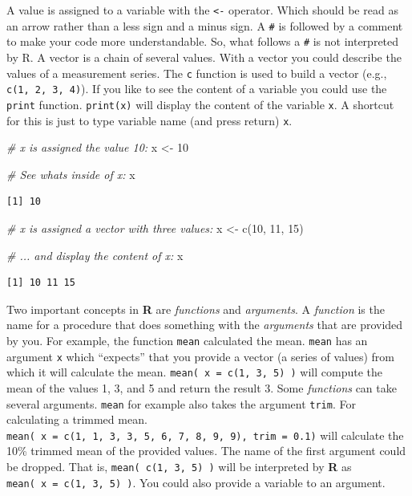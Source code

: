 \documentclass[
]{book}
\newenvironment{Shaded}{\begin{snugshade}}{\end{snugshade}}
\newcommand{\CommentTok}[1]{\textcolor[rgb]{0.56,0.35,0.01}{\textit{#1}}}
\newcommand{\DecValTok}[1]{\textcolor[rgb]{0.00,0.00,0.81}{#1}}
\newcommand{\FunctionTok}[1]{\textcolor[rgb]{0.00,0.00,0.00}{#1}}
\newcommand{\NormalTok}[1]{#1}
\newcommand{\OtherTok}[1]{\textcolor[rgb]{0.56,0.35,0.01}{#1}}
\begin{document}
A value is assigned to a variable with the \texttt{\textless{}-} operator. Which should be read as an arrow rather than a less sign and a minus sign. A \texttt{\#} is followed by a comment to make your code more understandable. So, what follows a \texttt{\#} is not interpreted by R. A vector is a chain of several values. With a vector you could describe the values of a measurement series. The \texttt{c} function is used to build a vector (e.g., \texttt{c(1,\ 2,\ 3,\ 4)}). If you like to see the content of a variable you could use the \texttt{print} function. \texttt{print(x)} will display the content of the variable \texttt{x}. A shortcut for this is just to type variable name (and press return) \texttt{x}.

\begin{Shaded}
\begin{Highlighting}[]
\CommentTok{\# x is assigned the value 10:}
\NormalTok{x }\OtherTok{\textless{}{-}} \DecValTok{10}

\CommentTok{\# See what\textquotesingle{}s inside of x:}
\NormalTok{x}
\end{Highlighting}
\end{Shaded}

\begin{verbatim}
[1] 10
\end{verbatim}

\begin{Shaded}
\begin{Highlighting}[]
\CommentTok{\# x is assigned a vector with three values:}
\NormalTok{x }\OtherTok{\textless{}{-}} \FunctionTok{c}\NormalTok{(}\DecValTok{10}\NormalTok{, }\DecValTok{11}\NormalTok{, }\DecValTok{15}\NormalTok{)}

\CommentTok{\# ... and display the content of x:}
\NormalTok{x}
\end{Highlighting}
\end{Shaded}

\begin{verbatim}
[1] 10 11 15
\end{verbatim}

Two important concepts in \textbf{R} are \emph{functions} and \emph{arguments}. A \emph{function} is the name for a procedure that does something with the \emph{arguments} that are provided by you. For example, the function \texttt{mean} calculated the mean. \texttt{mean} has an argument \texttt{x} which ``expects'' that you provide a vector (a series of values) from which it will calculate the mean. \texttt{mean(\ x\ =\ c(1,\ 3,\ 5)\ )} will compute the mean of the values 1, 3, and 5 and return the result 3. Some \emph{functions} can take several arguments. \texttt{mean} for example also takes the argument \texttt{trim}. For calculating a trimmed mean. \texttt{mean(\ x\ =\ c(1,\ 1,\ 3,\ 3,\ 5,\ 6,\ 7,\ 8,\ 9,\ 9),\ trim\ =\ 0.1)} will calculate the 10\% trimmed mean of the provided values. The name of the first argument could be dropped. That is, \texttt{mean(\ c(1,\ 3,\ 5)\ )} will be interpreted by \textbf{R} as \texttt{mean(\ x\ =\ c(1,\ 3,\ 5)\ )}. You could also provide a variable to an argument.
\end{document}
